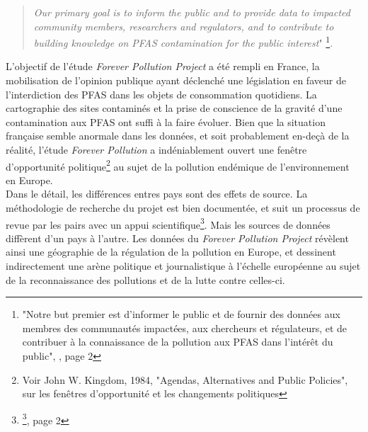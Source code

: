 \documentclass[a4paper,twoside,12pt]{book}
\begin{document}
\begin{quote}
\textit{\og Our primary goal is to inform the public and to provide data to impacted community members, researchers and regulators, and to contribute to building knowledge on PFAS contamination for the public interest}" \fg{} \footnote{"Notre but premier est d'informer le public et de fournir des données aux membres des communautés impactées, aux chercheurs et régulateurs, et de contribuer à la connaissance de la pollution aux PFAS dans l'intérêt du public", \cite{horel_stephane_methodology_2023}, page 2}.  
\end{quote}

L'objectif de l'étude \textit{Forever Pollution Project} a été rempli en France, la mobilisation de l'opinion publique ayant déclenché une législation en faveur de l'interdiction des PFAS dans les objets de consommation quotidiens. La cartographie des sites contaminés et la prise de conscience de la gravité d'une contamination aux PFAS ont suffi à la faire évoluer. Bien que la situation française semble anormale dans les données, et soit probablement en-deçà de la réalité, l'étude \textit{Forever Pollution} a indéniablement ouvert une fenêtre d'opportunité politique\footnote{Voir John W. Kingdom, 1984, "Agendas, Alternatives and Public Policies", sur les fenêtres d'opportunité et les changements politiques} au sujet de la pollution endémique de l'environnement en Europe. \\

Dans le détail, les différences entres pays sont des effets de source. La méthodologie de recherche du projet est bien documentée, et suit un processus de revue par les pairs avec un appui scientifique\footnote{\footcite{horel_stephane_methodology_2023}, page 2}.  Mais les sources de données diffèrent d'un pays à l'autre. Les données du \textit{Forever Pollution Project} révèlent ainsi une géographie de la régulation de la pollution en Europe, et dessinent indirectement une arène politique et journalistique à l'échelle européenne au sujet de la reconnaissance des pollutions et de la lutte contre celles-ci.
 
\end{document}
